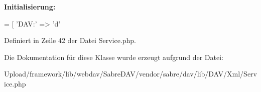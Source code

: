 {\bfseries Initialisierung\+:}
\begin{DoxyCode}
= [
        \textcolor{stringliteral}{'DAV:'}                   => \textcolor{charliteral}{'d'}
\end{DoxyCode}


Definiert in Zeile 42 der Datei Service.\+php.



Die Dokumentation für diese Klasse wurde erzeugt aufgrund der Datei\+:\begin{DoxyCompactItemize}
\item 
Upload/framework/lib/webdav/\+Sabre\+D\+A\+V/vendor/sabre/dav/lib/\+D\+A\+V/\+Xml/Service.\+php\end{DoxyCompactItemize}

